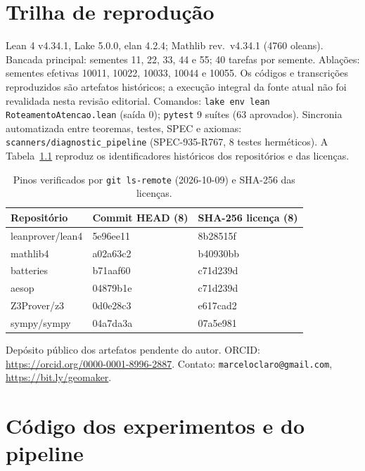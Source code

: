 \documentclass[12pt,openany,oneside,a4paper,brazil,chapter=TITLE]{abntex2}
\begin{document}
\chapter{Trilha de reprodução}
Lean 4 v4.34.1, Lake 5.0.0, elan 4.2.4; Mathlib rev.\ v4.34.1 (4760 oleans). Bancada principal: sementes 11, 22, 33, 44 e 55; 40 tarefas por semente. Ablações: sementes efetivas 10011, 10022, 10033, 10044 e 10055. Os códigos e transcrições reproduzidos são artefatos históricos; a execução integral da fonte atual não foi revalidada nesta revisão editorial. Comandos: \nolinkurl{lake env lean RoteamentoAtencao.lean} (saída 0); \texttt{pytest} 9 suítes (63 aprovados). Sincronia automatizada entre teoremas, testes, SPEC e axiomas: \nolinkurl{scanners/diagnostic_pipeline} (SPEC-935-R767, 8 testes herméticos).
A Tabela~\ref{tab:pins} reproduz os identificadores históricos dos repositórios e das licenças.
\begin{table}[htbp]
\fontsize{10}{12}\selectfont\SingleSpacing
\centering
\caption{Pinos verificados por \texttt{git ls-remote} (2026-10-09) e SHA-256 das licenças.}
\label{tab:pins}
\begin{tabularx}{\textwidth}{lXX}
\toprule
Repositório & Commit HEAD (8) & SHA-256 licença (8) \\
\midrule
leanprover/lean4 & 5e96ee11 & 8b28515f \\
mathlib4 & a02a63c2 & b40930bb \\
batteries & b71aaf60 & c71d239d \\
aesop & 04879b1e & c71d239d \\
Z3Prover/z3 & 0d0e28c3 & e617cad2 \\
sympy/sympy & 04a7da3a & 07a5e981 \\
\bottomrule
\end{tabularx}
\end{table}
Depósito público dos artefatos pendente do autor. ORCID: \url{https://orcid.org/0000-0001-8996-2887}. Contato: \texttt{marceloclaro@gmail.com}, \url{https://bit.ly/geomaker}.
\chapter{Código dos experimentos e do pipeline}
\label{ap:codigo}
\end{document}
